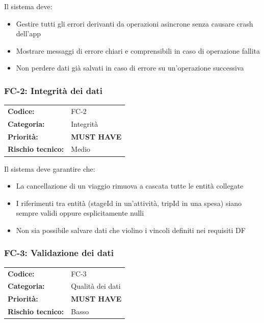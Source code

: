 \documentclass[12pt, a4paper]{article}
\newcommand{\MUST}{\colorbox{musthave}{\small\textbf{MUST HAVE}}}
\newcommand{\RISKL}{\colorbox{risklow}{\small Basso}}
\newcommand{\RISKM}{\colorbox{riskmed}{\small Medio}}
\begin{document}
\medskip
\noindent
Il sistema deve:
\begin{itemize}[leftmargin=1.5em, itemsep=1pt]
  \item Gestire tutti gli errori derivanti da operazioni asincrone senza causare crash dell'app
  \item Mostrare messaggi di errore chiari e comprensibili in caso di operazione fallita
  \item Non perdere dati già salvati in caso di errore su un'operazione successiva
\end{itemize}

\subsubsection{FC-2: Integrità dei dati}

\begin{tabular}{@{}ll@{}}
  \toprule
  \textbf{Codice:}          & FC-2 \\
  \textbf{Categoria:}       & Integrità \\
  \textbf{Priorità:}        & \MUST \\
  \textbf{Rischio tecnico:} & \RISKM \\
  \bottomrule
\end{tabular}

\medskip
\noindent
Il sistema deve garantire che:
\begin{itemize}[leftmargin=1.5em, itemsep=1pt]
  \item La cancellazione di un viaggio rimuova a cascata tutte le entità collegate
  \item I riferimenti tra entità (stageId in un'attività, tripId in una spesa) siano
    sempre validi oppure esplicitamente nulli
  \item Non sia possibile salvare dati che violino i vincoli definiti nei requisiti DF
\end{itemize}

\subsubsection{FC-3: Validazione dei dati}

\begin{tabular}{@{}ll@{}}
  \toprule
  \textbf{Codice:}          & FC-3 \\
  \textbf{Categoria:}       & Qualità dei dati \\
  \textbf{Priorità:}        & \MUST \\
  \textbf{Rischio tecnico:} & \RISKL \\
  \bottomrule
\end{tabular}
\end{document}
